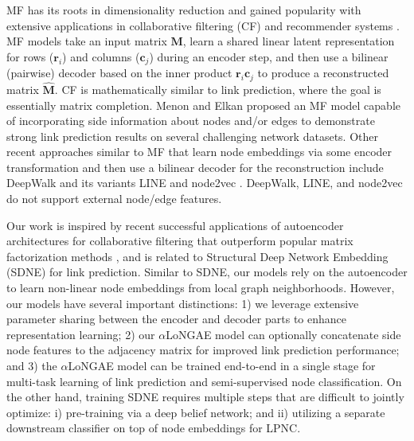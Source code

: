 \documentclass[letterpaper, conference]{IEEEtran}  %
\begin{document}
MF has its roots in dimensionality reduction and gained popularity with extensive applications in collaborative filtering (CF) and recommender systems \cite{Koren:2009}. MF models take an input matrix $\mathbf{M}$, learn a shared linear latent representation for rows ($\mathbf{r}_i$) and columns ($\mathbf{c}_j$) during an encoder step, and then use a bilinear (pairwise) decoder based on the inner product $\mathbf{r}_i\mathbf{c}_j$ to produce a reconstructed matrix $\mathbf{\hat{M}}$. CF is mathematically similar to link prediction, where the goal is essentially matrix completion. Menon and Elkan \cite{Menon:2011} proposed an MF model capable of incorporating side information about nodes and/or edges to demonstrate strong link prediction results on several challenging network datasets. Other recent approaches similar to MF that learn node embeddings via some encoder transformation and then use a bilinear decoder for the reconstruction include DeepWalk \cite{Perozzi:2014} and its variants LINE \cite{Tang:2015} and node2vec \cite{Grover:2016}. DeepWalk, LINE, and node2vec do not support external node/edge features.

Our work is inspired by recent successful applications of autoencoder architectures for collaborative filtering that outperform popular matrix factorization methods \cite{Sedhain:2015,Strub:2016,Kuchaiev:2017}, and is related to Structural Deep Network Embedding (SDNE) \cite{Wang:2016} for link prediction. Similar to SDNE, our models rely on the autoencoder to learn non-linear node embeddings from local graph neighborhoods. However, our models have several important distinctions: 1) we leverage extensive parameter sharing between the encoder and decoder parts to enhance representation learning; 2) our $\alpha$LoNGAE model can optionally concatenate side node features to the adjacency matrix for improved link prediction performance; and 3) the $\alpha$LoNGAE model can be trained end-to-end in a single stage for multi-task learning of link prediction and semi-supervised node classification. On the other hand, training SDNE requires multiple steps that are difficult to jointly optimize: i) pre-training via a deep belief network; and ii) utilizing a separate downstream classifier on top of node embeddings for LPNC.
\end{document}
